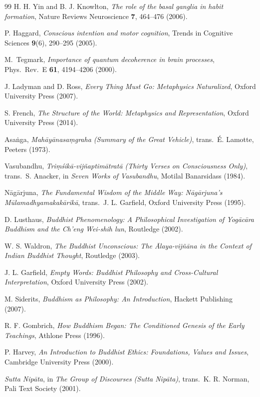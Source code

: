 \documentclass[11pt,a4paper]{article}
\begin{document}
\begin{thebibliography}{99}
H. H. Yin and B. J. Knowlton, \emph{The role of the basal ganglia in habit formation}, Nature Reviews Neuroscience \textbf{7}, 464--476 (2006).

P. Haggard, \emph{Conscious intention and motor cognition}, Trends in Cognitive Sciences \textbf{9}(6), 290--295 (2005).

M.~Tegmark,
\emph{Importance of quantum decoherence in brain processes},
Phys.\ Rev.\ E \textbf{61}, 4194--4206 (2000).

J. Ladyman and D. Ross, \emph{Every Thing Must Go: Metaphysics Naturalized}, Oxford University Press (2007).

S. French, \emph{The Structure of the World: Metaphysics and Representation}, Oxford University Press (2014).

Asaṅga, \emph{Mahāyānasaṃgraha (Summary of the Great Vehicle)}, trans.\ É. Lamotte, Peeters (1973).

Vasubandhu, \emph{Triṃśikā-vijñaptimātratā (Thirty Verses on Consciousness Only)}, trans.\ S. Anacker, in \emph{Seven Works of Vasubandhu}, Motilal Banarsidass (1984).

Nāgārjuna, \emph{The Fundamental Wisdom of the Middle Way: Nāgārjuna's Mūlamadhyamakakārikā}, trans.\ J. L. Garfield, Oxford University Press (1995).

D. Lusthaus, \emph{Buddhist Phenomenology: A Philosophical Investigation of Yogācāra Buddhism and the Ch'eng Wei-shih lun}, Routledge (2002).

W. S. Waldron, \emph{The Buddhist Unconscious: The Ālaya-vijñāna in the Context of Indian Buddhist Thought}, Routledge (2003).

J. L. Garfield, \emph{Empty Words: Buddhist Philosophy and Cross-Cultural Interpretation}, Oxford University Press (2002).

M. Siderits, \emph{Buddhism as Philosophy: An Introduction}, Hackett Publishing (2007).

R. F. Gombrich, \emph{How Buddhism Began: The Conditioned Genesis of the Early Teachings}, Athlone Press (1996).

P. Harvey, \emph{An Introduction to Buddhist Ethics: Foundations, Values and Issues}, Cambridge University Press (2000).

\emph{Sutta Nipāta}, in \emph{The Group of Discourses (Sutta Nipāta)}, trans.\ K. R. Norman, Pali Text Society (2001).

\end{thebibliography}
\end{document}
